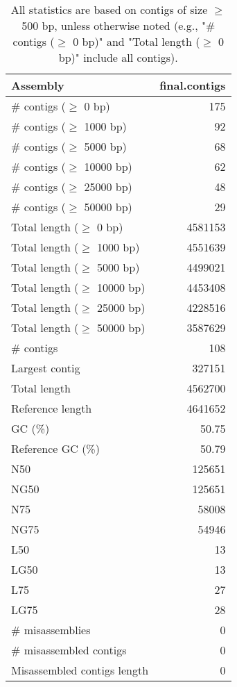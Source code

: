 \documentclass[12pt,a4paper]{article}
\begin{document}
\begin{table}[ht]
\begin{center}
\caption{All statistics are based on contigs of size $\geq$ 500 bp, unless otherwise noted (e.g., "\# contigs ($\geq$ 0 bp)" and "Total length ($\geq$ 0 bp)" include all contigs).}
\begin{tabular}{|l*{1}{|r}|}
\hline
Assembly & final.contigs \\ \hline
\# contigs ($\geq$ 0 bp) & 175 \\ \hline
\# contigs ($\geq$ 1000 bp) & 92 \\ \hline
\# contigs ($\geq$ 5000 bp) & 68 \\ \hline
\# contigs ($\geq$ 10000 bp) & 62 \\ \hline
\# contigs ($\geq$ 25000 bp) & 48 \\ \hline
\# contigs ($\geq$ 50000 bp) & 29 \\ \hline
Total length ($\geq$ 0 bp) & 4581153 \\ \hline
Total length ($\geq$ 1000 bp) & 4551639 \\ \hline
Total length ($\geq$ 5000 bp) & 4499021 \\ \hline
Total length ($\geq$ 10000 bp) & 4453408 \\ \hline
Total length ($\geq$ 25000 bp) & 4228516 \\ \hline
Total length ($\geq$ 50000 bp) & 3587629 \\ \hline
\# contigs & 108 \\ \hline
Largest contig & 327151 \\ \hline
Total length & 4562700 \\ \hline
Reference length & 4641652 \\ \hline
GC (\%) & 50.75 \\ \hline
Reference GC (\%) & 50.79 \\ \hline
N50 & 125651 \\ \hline
NG50 & 125651 \\ \hline
N75 & 58008 \\ \hline
NG75 & 54946 \\ \hline
L50 & 13 \\ \hline
LG50 & 13 \\ \hline
L75 & 27 \\ \hline
LG75 & 28 \\ \hline
\# misassemblies & 0 \\ \hline
\# misassembled contigs & 0 \\ \hline
Misassembled contigs length & 0 \\ \hline

\end{tabular}
\end{center}
\end{table}
\end{document}
